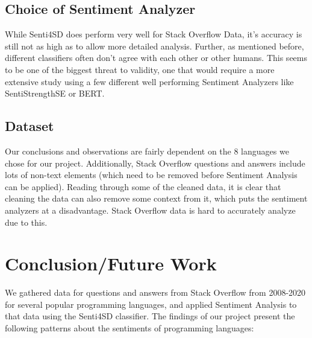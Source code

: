 \documentclass[conference]{IEEEtran}
\begin{document}
\subsection{Choice of Sentiment Analyzer}
While Senti4SD does perform very well for Stack Overflow Data, it's accuracy is still not as high as to allow more detailed analysis. Further, as mentioned before, different classifiers often don't agree with each other or other humans. This seems to be one of the biggest threat to validity, one that would require a more extensive study using a few different well performing Sentiment Analyzers like SentiStrengthSE or BERT. \\

\subsection{Dataset}
Our conclusions and observations are fairly dependent on the 8 languages we chose for our project. Additionally, Stack Overflow questions and answers include lots of non-text elements (which need to be removed before Sentiment Analysis can be applied). Reading through some of the cleaned data, it is clear that cleaning the data can also remove some context from it, which puts the sentiment analyzers at a disadvantage. Stack Overflow data is hard to accurately analyze due to this.\\ 

\section{Conclusion/Future Work}
We gathered data for questions and answers from Stack Overflow from 2008-2020 for several popular programming languages, and applied Sentiment Analysis to that data using the Senti4SD classifier. The findings of our project present the following patterns about the sentiments of programming languages:\\
\end{document}
